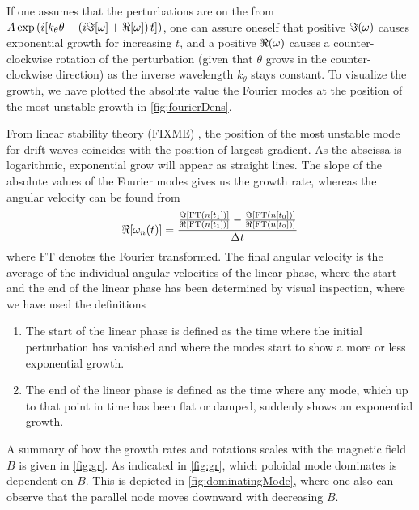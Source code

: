 %
If one assumes that the perturbations are on the from $A\exp\left(i[k_\theta \theta - \left(i\Im[\omega] + \Re[\omega]\right) t]\right)$, one can assure oneself that positive $\Im(\omega)$ causes exponential growth for increasing $t$, and a positive $\Re(\omega)$ causes a counter-clockwise rotation of the perturbation (given that $\theta$ grows in the counter-clockwise direction) as the inverse wavelength $k_\theta$ stays constant.
To visualize the growth, we have plotted the absolute value the Fourier modes at the position of the most unstable growth in \cref{fig:fourierDens}.

From linear stability theory (FIXME)
, the position of the most unstable mode for drift waves coincides with the position of largest gradient.
As the abscissa is logarithmic, exponential grow will appear as straight lines.
The slope of the absolute values of the Fourier modes gives us the growth rate, whereas the angular velocity can be found from
%
\begin{align*}
    \Re[\omega_n(t)] =
    \frac{
        \frac{\Im[\text{FT}(n[t_1])]}{\Re[\text{FT}(n[t_1])]} -
        \frac{\Im[\text{FT}(n[t_0])]}{\Re[\text{FT}(n[t_0])]}
    }{\Delta t}
\end{align*}
%
where $\text{FT}$ denotes the Fourier transformed.
The final angular velocity is the average of the individual angular velocities of the linear phase, where the start and the end of the linear phase has been determined by visual inspection, where we have used the definitions
%
\begin{enumerate}
    \item The start of the linear phase is defined as the time where the initial perturbation has vanished and where the modes start to show a more or less exponential growth.
    \item The end of the linear phase is defined as the time where any mode, which up to that point in time has been flat or damped, suddenly shows an exponential growth.
\end{enumerate}
%
A summary of how the growth rates and rotations scales with the magnetic field $B$ is given in \cref{fig:gr}.
As indicated in \cref{fig:gr}, which poloidal mode dominates is dependent on $B$.
This is depicted in \cref{fig:dominatingMode}, where one also can observe that the parallel node moves downward with decreasing $B$.
%
